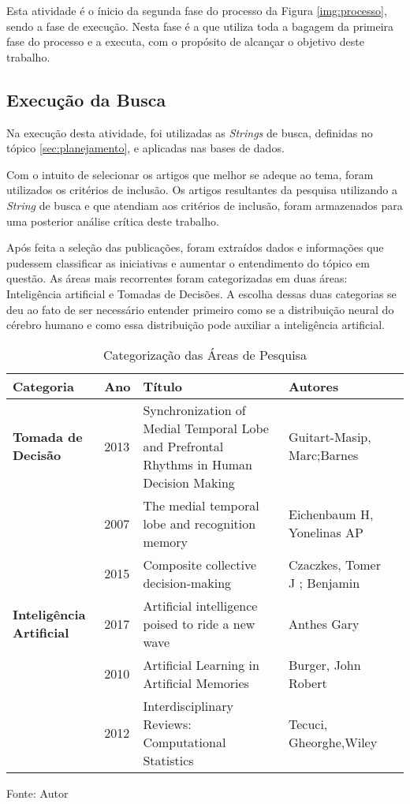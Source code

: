 Esta atividade é o ínicio da segunda fase do processo da Figura \ref{img:processo}, sendo a fase de execução. Nesta fase é a que utiliza toda a bagagem da primeira fase do processo e a executa, com o propósito de alcançar o objetivo deste trabalho.

\subsection{Execução da Busca}

Na execução desta atividade, foi utilizadas as \textit{Strings} de busca, definidas no tópico \ref{sec:planejamento}, e aplicadas nas bases de dados.

Com o intuito de selecionar os artigos que melhor se adeque ao tema, foram utilizados os critérios de inclusão. Os artigos resultantes da pesquisa utilizando a \textit{String} de busca e que atendiam aos critérios de inclusão, foram armazenados para uma posterior análise crítica deste trabalho.

Após feita a seleção das publicações, foram extraídos dados e informações que pudessem classificar as iniciativas e aumentar o entendimento do tópico em questão. As áreas mais recorrentes foram categorizadas em duas áreas: Inteligência artificial e Tomadas de Decisões. A escolha dessas duas categorias se deu ao fato de ser necessário entender primeiro como se a distribuição neural do cérebro humano e como essa distribuição pode auxiliar a inteligência artificial.

\begin{table}[h]
\centering
\begin{tabular}{ | l | l | p{5cm} | l | p{10cm} |}
\hline
\rowcolor[HTML]{F8FF00} 
{\color[HTML]{000000} \textbf{Categoria}} & \textbf{Ano} & \textbf{Título} & \textbf{Autores}        \\ \hline
{\cellcolor[HTML]{34FF34}}\textbf{Tomada de Decisão}               & 2013                   & Synchronization of Medial Temporal Lobe and Prefrontal Rhythms in Human Decision Making    & Guitart-Masip, Marc;Barnes          \\ \hline
 & 2007 & The medial temporal lobe and recognition memory & Eichenbaum H, Yonelinas AP\\ \hline
 & 2015 & Composite collective decision-making & Czaczkes, Tomer J ; Benjamin \\ \hline
 {\cellcolor[HTML]{34FF34}}\textbf{Inteligência Artificial} & 2017 & Artificial intelligence poised to ride a new wave & Anthes Gary \\ \hline
 & 2010 & Artificial Learning in Artificial Memories & Burger, John Robert \\ \hline
 & 2012 & Interdisciplinary Reviews: Computational Statistics & Tecuci, Gheorghe,Wiley \\ \hline
\end{tabular}
\caption{Categorização das Áreas de Pesquisa}
Fonte: Autor
\label{tab:categorizacao}
\end{table}